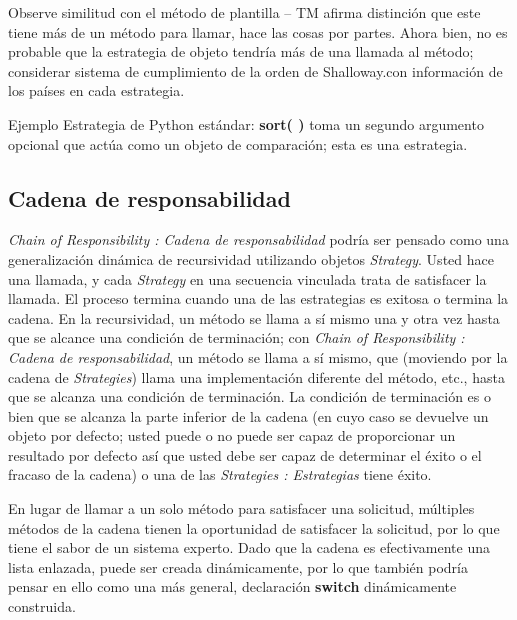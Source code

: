 \documentclass{article}
\begin{document}
Observe similitud con el método de plantilla  – TM afirma distinción que este tiene más de un método para llamar, hace las cosas por partes. Ahora bien, no es probable que la estrategia de objeto tendría más de una llamada al método; considerar sistema de cumplimiento de la orden de Shalloway.con información de los países en cada estrategia.  \newline

Ejemplo Estrategia de Python estándar: \textbf{sort( )} toma un segundo argumento opcional que actúa como un objeto de comparación; esta es una estrategia.    \newpage

\subsection{Cadena de responsabilidad}

\textit{Chain of Responsibility : Cadena de responsabilidad} podría ser pensado como una generalización dinámica de recursividad utilizando objetos \textit{Strategy}. Usted hace una llamada, y cada \textit{Strategy} en una secuencia vinculada trata de satisfacer la llamada. El proceso termina cuando una de las estrategias es exitosa o termina la cadena. En la recursividad, un método se llama a sí mismo una y otra vez hasta que se alcance una condición de terminación; con \textit{Chain of Responsibility : Cadena de responsabilidad}, un método se llama a sí mismo, que (moviendo por la cadena de \textit{Strategies}) llama una implementación diferente del método, etc., hasta que se alcanza una condición de terminación. La condición de terminación es o bien que se alcanza la parte inferior de la cadena (en cuyo caso se devuelve un objeto por defecto; usted puede o no puede ser capaz de proporcionar un resultado por defecto así que usted debe ser capaz de determinar el éxito o el fracaso de la cadena) o una de las \textit{Strategies : Estrategias} tiene éxito.      \newline

En lugar de llamar a un solo método para satisfacer una solicitud, múltiples métodos de la cadena tienen la oportunidad de satisfacer la solicitud, por lo que tiene el sabor de un sistema experto. Dado que la cadena es efectivamente una lista enlazada, puede ser creada dinámicamente, por lo que también podría pensar en ello como una más general, declaración \textbf{switch} dinámicamente construida.   \newline
\end{document}
